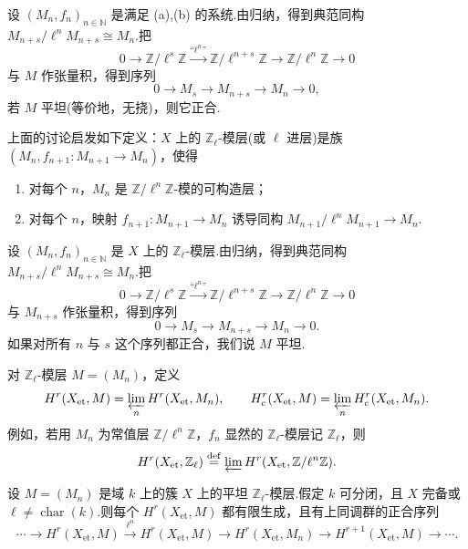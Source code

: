 设 $(M_n, f_n)_{n \in \mathbb{N}}$ 是满足 (a),(b) 的系统.由归纳，得到典范同构 $M_{n+s}/\ell^{n}M_{n+s} \cong M_n$.把
\[
0 \to \mathbb{Z}/\ell^{s}\mathbb{Z} \xrightarrow{\text{``}\ell^{n}\text{''}} \mathbb{Z}/\ell^{n+s}\mathbb{Z} \to \mathbb{Z}/\ell^{n}\mathbb{Z} \to 0
\]
与 $M$ 作张量积，得到序列
\[
0 \to M_s \to M_{n+s} \to M_n \to 0,
\]
若 $M$ 平坦(等价地，无挠)，则它正合.

上面的讨论启发如下定义：$X$ 上的 $\mathbb{Z}_{\ell}$-模层(或 $\ell$ 进层)是族 $(M_n, f_{n+1} \colon M_{n+1} \to M_n)$，使得
\begin{enumerate}
  \item 对每个 $n$，$M_n$ 是 $\mathbb{Z}/\ell^{n}\mathbb{Z}$-模的可构造层；
  \item 对每个 $n$，映射 $f_{n+1} \colon M_{n+1} \to M_n$ 诱导同构 $M_{n+1}/\ell^{n}M_{n+1} \to M_n$.
\end{enumerate}

设 $(M_n, f_n)_{n \in \mathbb{N}}$ 是 $X$ 上的 $\mathbb{Z}_{\ell}$-模层.由归纳，得到典范同构 $M_{n+s}/\ell^{n}M_{n+s} \cong M_n$.把
\[
0 \to \mathbb{Z}/\ell^{s}\mathbb{Z} \xrightarrow{\text{``}\ell^{n}\text{''}} \mathbb{Z}/\ell^{n+s}\mathbb{Z} \to \mathbb{Z}/\ell^{n}\mathbb{Z} \to 0
\]
与 $M_{n+s}$ 作张量积，得到序列
\[
0 \to M_s \to M_{n+s} \to M_n \to 0.
\]
如果对所有 $n$ 与 $s$ 这个序列都正合，我们说 $M$ 平坦.

对 $\mathbb{Z}_{\ell}$-模层 $M = (M_n)$，定义
\[
H^{r}(X_{\mathrm{et}}, M) = \varprojlim_{n} H^{r}(X_{\mathrm{et}}, M_n), \qquad H^{r}_{c}(X_{\mathrm{et}}, M) = \varprojlim_{n} H^{r}_{c}(X_{\mathrm{et}}, M_n).
\]
例如，若用 $M_n$ 为常值层 $\mathbb{Z}/\ell^{n}\mathbb{Z}$，$f_n$ 显然的 $\mathbb{Z}_{\ell}$-模层记 $\mathbb{Z}_{\ell}$，则
\[
H^{r}(X_{\mathrm{et}}, \mathbb{Z}_{\ell}) \overset{\mathrm{def}}{=} \varprojlim H^{r}(X_{\mathrm{et}}, \mathbb{Z}/\ell^{n}\mathbb{Z}).
\]

\begin{theorem}\label{thm:19.2}
设 $M = (M_n)$ 是域 $k$ 上的簇 $X$ 上的平坦 $\mathbb{Z}_{\ell}$-模层.假定 $k$ 可分闭，且 $X$ 完备或 $\ell \neq \operatorname{char}(k)$.则每个 $H^{r}(X_{\mathrm{et}}, M)$ 都有限生成，且有上同调群的正合序列
\[
\cdots \to H^{r}(X_{\mathrm{et}}, M) \xrightarrow{\ell^{n}} H^{r}(X_{\mathrm{et}}, M) \to H^{r}(X_{\mathrm{et}}, M_n) \to H^{r+1}(X_{\mathrm{et}}, M) \to \cdots.
\]
\end{theorem}

